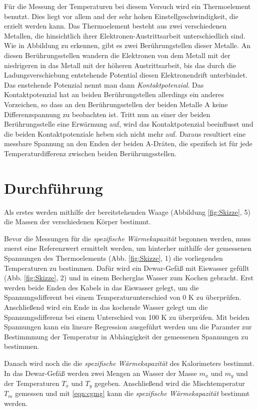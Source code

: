 Für die Messung der Temperaturen bei diesem Versuch wird ein Thermoelement benutzt.
Dies liegt vor allem and der sehr hohen Einstellgeschwindigkeit, die erzielt werden
kann. Das Thermoelement besteht aus zwei verschiedenen Metallen, die hinsichtlich
ihrer Elektronen-Austrittsarbeit unterschiedlich sind. Wie in Abbildung %
zu erkennen, gibt es zwei Berührungstellen dieser Metalle. An diesen Berührungsstellen
wandern die Elektronen von dem Metall mit der niedrigeren in das Metall mit der
höheren Austrittsarbeit, bis das durch die Ladungsverschiebung entstehende Potential
diesen Elektronendrift unterbindet. Das enstehende Potenzial nennt man dann
\emph{Kontaktpotenzial}. Das Kontaktpotenzial hat an beiden Berührungstellen
allerdings ein anderes Vorzeichen, so dass an den Berührungsstellen der beiden
Metalle A keine Differenzspannung zu beobachten ist. Tritt nun an einer der beiden
Berührungsstelle eine Erwärmung auf, wird das Kontaktpotenzial beeinflusst und
die beiden Kontaktpotenziale heben sich nicht mehr auf. Daraus resultiert eine
messbare Spannung an den Enden der beiden A-Dräten, die spezifsch ist für jede
Temperaturdifferenz zwischen beiden Berührungsstellen.

\section{Durchführung}

Als erstes werden mithilfe der bereitstehenden Waage (Abbildung \ref{fig:Skizze}, 5)
die Massen der verschiedenen Körper bestimmt.

Bevor die Messungen für die \emph{spezifische Wärmekapazität} begonnen werden,
muss zuerst eine Referenzwert ermittelt werden, um hinterher mithilfe der gemessenen
Spannungen des Thermoelements (Abb. \ref{fig:Skizze}, 1) die vorliegenden Temperaturen zu bestimmen.
Dafür wird ein Dewar-Gefäß mit Eiswasser gefüllt (Abb. \ref{fig:Skizze}, 2) und in einem Becherglas
Wasser zum Kochen gebracht. Erst werden
beide Enden des Kabels in das Eiswasser gelegt, um die Spannungsdifferent bei
einem Temperaturunterschied von 0 K zu überprüfen. Anschließend wird ein Ende in
das kochende Wasser gelegt um die Spannungsdifferenz bei einem Unterschied von
100 K zu überprüfen. Mit beiden Spannungen kann ein lineare Regression ausgeführt
werden um die Paramter zur Bestimmmung der Temperatur in Abhängigkeit der
gemessenen Spannungen zu bestimmen.

Danach wird noch die die \emph{spezifische Wärmekapazität} des Kalorimeters bestimmt.
In das Dewar-Gefäß werden zwei Mengen an Wasser der Masse $m_x$ und $m_y$ und der
Temperaturen $T_x$ und $T_y$ gegeben. Anschließend wird die Mischtemperatur
$T_m$ gemessen und mit \eqref{eqn:cgmg} kann die \emph{spezifische Wärmekapazität}
bestimmt werden.


